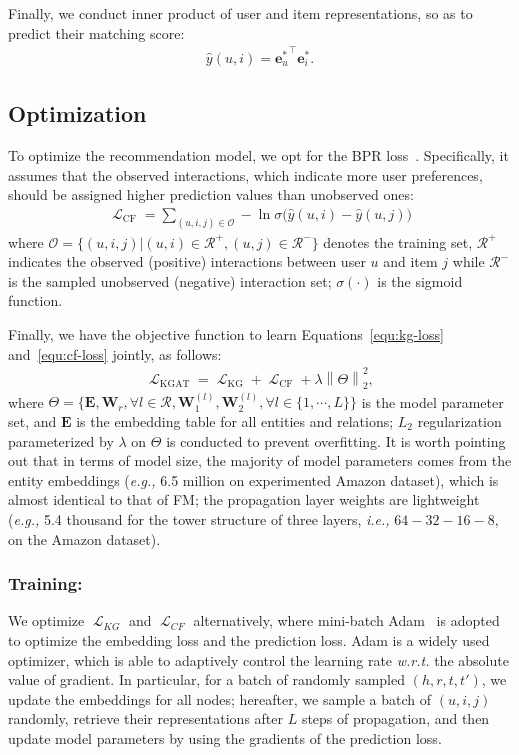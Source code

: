 \documentclass[sigconf]{acmart}
\newcommand\norm[1]{\left\lVert#1\right\rVert}
\newcommand{\Lapl}{\mathbf{\mathop{\mathcal{L}}}}
\newcommand{\Trans}[1]{{#1}^{\top}}
\newcommand{\Mat}[1]{\mathbf{#1}}
\newcommand{\Set}[1]{\mathcal{#1}}
\newcommand{\ie}{\emph{i.e., }}
\newcommand{\eg}{\emph{e.g., }}
\newcommand{\wrt}{\emph{w.r.t. }}
\theoremstyle{definition}
\begin{document}
Finally, we conduct inner product of user and item representations, so as to predict their matching score:
\begin{align}
    \hat{y}(u,i)=\Trans{\Mat{e}^{*}_{u}}\Mat{e}^{*}_{i}.
\end{align}


\subsection{Optimization}

To optimize the recommendation model, we opt for the BPR loss~\cite{BPRMF}.
Specifically, it assumes that the observed interactions, which indicate more user preferences, should be assigned higher prediction values than unobserved ones:
\begin{align}\label{equ:cf-loss}
	\Lapl_{\text{CF}}=\sum_{(u,i,j)\in\Set{O}}-\ln\sigma\Big(\hat{y}(u,i)-\hat{y}(u,j)\Big)
\end{align}
where $\Set{O}=\{(u,i,j)|(u,i)\in\Set{R}^{+}, (u,j)\in\Set{R}^{-}\}$ denotes the training set, $\Set{R}^{+}$ indicates the observed (positive) interactions between user $u$ and item $j$ while $\Set{R}^{-}$ is the sampled unobserved (negative) interaction set;
$\sigma(\cdot)$ is the sigmoid function.

Finally, we have the objective function to learn Equations~\eqref{equ:kg-loss} and~\eqref{equ:cf-loss} jointly, as follows:
\begin{align}\label{equ:loss}
    \Lapl_{\text{KGAT}}=\Lapl_{\text{KG}}+\Lapl_{\text{CF}}+\lambda\norm{\Theta}^{2}_{2},
\end{align}
where $\Theta=\{\Mat{E}, \Mat{W}_{r},\forall l\in\Set{R},\Mat{W}_{1}^{(l)},\Mat{W}_{2}^{(l)}, \forall l \in \{1,\cdots,L\}\}$ is the model parameter set, and $\Mat{E}$ is the embedding table for all entities and relations;
$L_{2}$ regularization parameterized by $\lambda$ on $\Theta$ is conducted to prevent overfitting.
It is worth pointing out that in terms of model size, the majority of model parameters comes from the entity embeddings (\eg 6.5 million on experimented Amazon dataset), which is almost identical to that of FM;
the propagation layer weights are lightweight (\eg 5.4 thousand for the tower structure of three layers, \ie $64-32-16-8$, on the Amazon dataset).

\subsubsection{\textbf{Training:}}
We optimize $\Lapl_{KG}$ and $\Lapl_{CF}$ alternatively, where mini-batch Adam~\cite{Adam} is adopted to optimize the embedding loss and the prediction loss.
Adam is a widely used optimizer, which is able to adaptively control the learning rate \wrt the absolute value of gradient.
In particular, for a batch of randomly sampled $(h,r,t,t')$, we update the embeddings for all nodes; hereafter, we sample a batch of $(u,i,j)$ randomly, retrieve their representations after $L$ steps of propagation, and then update model parameters by using the gradients of the prediction loss.
\end{document}
